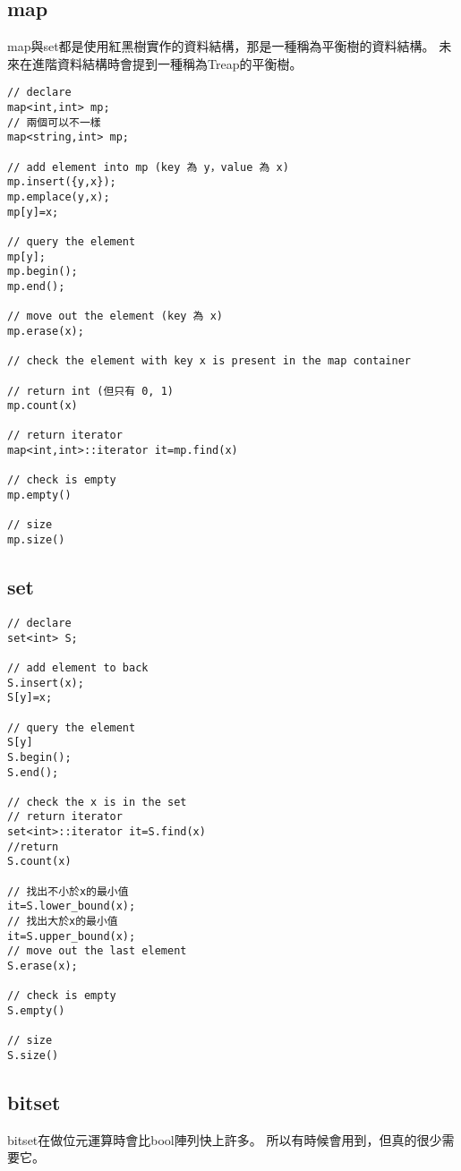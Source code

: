     \subsection{map}
    map與set都是使用紅黑樹實作的資料結構，那是一種稱為平衡樹的資料結構。
    未來在進階資料結構時會提到一種稱為Treap的平衡樹。

\begin{lstlisting}[caption=map 用法]
// declare
map<int,int> mp;
// 兩個可以不一樣
map<string,int> mp;

// add element into mp (key 為 y，value 為 x)
mp.insert({y,x});
mp.emplace(y,x);
mp[y]=x;

// query the element
mp[y];
mp.begin();
mp.end();

// move out the element (key 為 x)
mp.erase(x);

// check the element with key x is present in the map container

// return int (但只有 0, 1)
mp.count(x)

// return iterator
map<int,int>::iterator it=mp.find(x)

// check is empty
mp.empty()
        
// size
mp.size()
\end{lstlisting}

    \subsection{set}

\begin{lstlisting}[caption=set 用法]
// declare
set<int> S;

// add element to back
S.insert(x);
S[y]=x;

// query the element
S[y]
S.begin();
S.end();

// check the x is in the set
// return iterator
set<int>::iterator it=S.find(x)
//return
S.count(x)

// 找出不小於x的最小值
it=S.lower_bound(x);
// 找出大於x的最小值
it=S.upper_bound(x);
// move out the last element
S.erase(x);

// check is empty
S.empty()
    
// size
S.size()
\end{lstlisting}

    \subsection{bitset}
    bitset在做位元運算時會比bool陣列快上許多。
    所以有時候會用到，但真的很少需要它。

